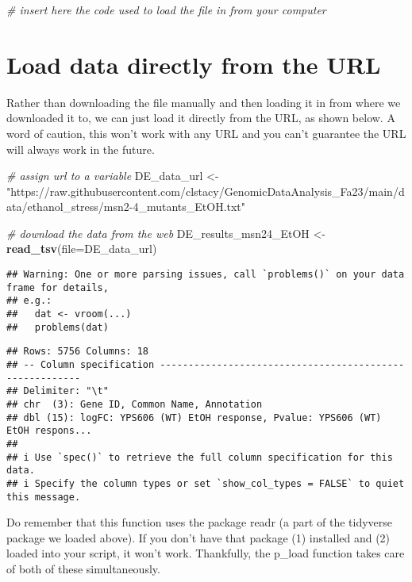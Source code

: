 \documentclass[
]{book}
\newenvironment{Shaded}{\begin{snugshade}}{\end{snugshade}}
\newcommand{\AttributeTok}[1]{\textcolor[rgb]{0.13,0.29,0.53}{#1}}
\newcommand{\CommentTok}[1]{\textcolor[rgb]{0.56,0.35,0.01}{\textit{#1}}}
\newcommand{\FunctionTok}[1]{\textcolor[rgb]{0.13,0.29,0.53}{\textbf{#1}}}
\newcommand{\NormalTok}[1]{#1}
\newcommand{\OtherTok}[1]{\textcolor[rgb]{0.56,0.35,0.01}{#1}}
\newcommand{\StringTok}[1]{\textcolor[rgb]{0.31,0.60,0.02}{#1}}
\begin{document}
\begin{Shaded}
\begin{Highlighting}[]
\CommentTok{\# insert here the code used to load the file in from your computer}
\end{Highlighting}
\end{Shaded}

\hypertarget{load-data-directly-from-the-url}{%
\section{Load data directly from the URL}\label{load-data-directly-from-the-url}}

Rather than downloading the file manually and then loading it in from where we downloaded it to, we can just load it directly from the URL, as shown below. A word of caution, this won't work with any URL and you can't guarantee the URL will always work in the future.

\begin{Shaded}
\begin{Highlighting}[]
\CommentTok{\# assign url to a variable}
\NormalTok{DE\_data\_url }\OtherTok{\textless{}{-}} \StringTok{"https://raw.githubusercontent.com/clstacy/GenomicDataAnalysis\_Fa23/main/data/ethanol\_stress/msn2{-}4\_mutants\_EtOH.txt"}

\CommentTok{\# download the data from the web}
\NormalTok{DE\_results\_msn24\_EtOH }\OtherTok{\textless{}{-}}
  \FunctionTok{read\_tsv}\NormalTok{(}\AttributeTok{file=}\NormalTok{DE\_data\_url)}
\end{Highlighting}
\end{Shaded}

\begin{verbatim}
## Warning: One or more parsing issues, call `problems()` on your data frame for details,
## e.g.:
##   dat <- vroom(...)
##   problems(dat)
\end{verbatim}

\begin{verbatim}
## Rows: 5756 Columns: 18
## -- Column specification --------------------------------------------------------
## Delimiter: "\t"
## chr  (3): Gene ID, Common Name, Annotation
## dbl (15): logFC: YPS606 (WT) EtOH response, Pvalue: YPS606 (WT) EtOH respons...
## 
## i Use `spec()` to retrieve the full column specification for this data.
## i Specify the column types or set `show_col_types = FALSE` to quiet this message.
\end{verbatim}

Do remember that this function uses the package readr (a part of the tidyverse package we loaded above). If you don't have that package (1) installed and (2) loaded into your script, it won't work. Thankfully, the p\_load function takes care of both of these simultaneously.
\end{document}
